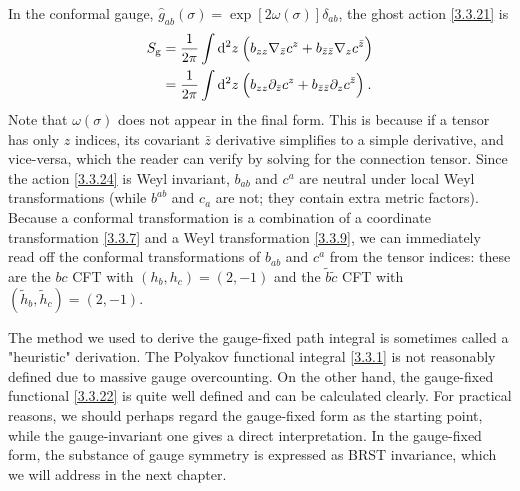 In the conformal gauge, $\hat{g}_{a b}(\sigma)=\exp [2 \omega(\sigma)] \delta_{a b}$, the ghost action \eqref{3.3.21} is    
\begin{align}
	S_{\mathrm{g}} &=\frac{1}{2 \pi} \int \mathrm{d}^{2} z\:\Bigl(b_{z z} \nabla_{\bar{z}} c^{z}+b_{\bar{z} \bar{z}} \nabla_{z} c^{\bar{z}}\Bigr)  \nonumber \\
	&=\frac{1}{2 \pi} \int \mathrm{d}^{2} z\:\Bigl(b_{z z} \partial_{\bar{z}} c^{z}+b_{\bar{z} \bar{z}} \partial_{z} c^{\bar{z}}\Bigr) \:.
	\label{3.3.24}
\end{align}
Note that $\omega(\sigma)$ does not appear in the final form. This is because if a tensor has only $z$ indices, its covariant $\bar{z}$ derivative simplifies to a simple derivative, and vice-versa, which the reader can verify by solving for the connection tensor. 
Since the action \eqref{3.3.24} is Weyl invariant, $b_{a b}$ and $c^{a}$ are neutral under local Weyl transformations (while $b^{a b}$ and $c_{a}$ are not; they contain extra metric factors).    
Because a conformal transformation is a combination of a coordinate transformation \eqref{3.3.7} and a Weyl transformation \eqref{3.3.9}, we can immediately read off the conformal transformations of $b_{a b}$ and $c^{a}$ from the tensor indices: these are the $bc$ CFT with $(h_{b}, h_{c})=(2,-1)$ and the $\tilde{b} \tilde{c}$ CFT with $(\tilde{h}_{b}, \tilde{h}_{c})=(2,-1)$.    

The method we used to derive the gauge-fixed path integral is sometimes called a "heuristic" derivation. The Polyakov functional integral \eqref{3.3.1} is not reasonably defined due to massive gauge overcounting.    
On the other hand, the gauge-fixed functional \eqref{3.3.22} is quite well defined and can be calculated clearly. For practical reasons, we should perhaps regard the gauge-fixed form as the starting point, while the gauge-invariant one gives a direct interpretation. In the gauge-fixed form, the substance of gauge symmetry is expressed as BRST invariance, which we will address in the next chapter.    

